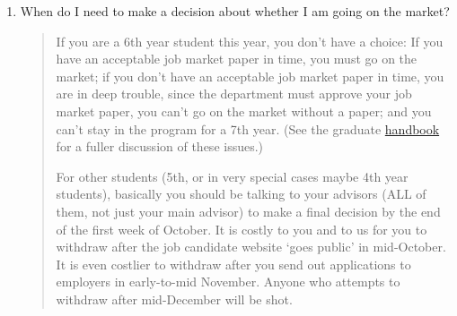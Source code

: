\documentclass{\classes/econtex}
\begin{document}
\begin{enumerate}
\item  When do I need to make a decision about whether I am going on
  the market?

  \begin{quote}
    If you are a 6th year student this year, you don't have a choice: If
    you have an acceptable job market paper in time, you must go on the
    market; if you don't have an acceptable job market paper in time, you
    are in deep trouble, since the department must approve your job market
    paper, you can't go on the market without a paper; and you can't stay
    in the program for a 7th year.  (See the graduate \href{http://www.econ2.jhu.edu/pdf/Econ\_Grad\_Handbook.pdf}{handbook} for a fuller discussion of these issues.) 

      For other students (5th, or in very special cases maybe 4th year students), basically you should be talking to your advisors (ALL of them, not just your main advisor) to make a final decision by the end of the first week of October.  It is costly to you and to us for you to withdraw after the job candidate website `goes public' in mid-October.  It is even costlier to withdraw after you send out applications to employers in early-to-mid November.  Anyone who attempts to withdraw after mid-December will be shot.

      \begin{comment}

        In the dept meeting on 2006-10-17 a question was raised about
        whether we are really serious about our policy, as stated by Larry,
        that ``there is no such thing as a 7th year student.''  

        The answer is yes.

        There was then some discussion about the relationship between going
        on the job market and remaining in the program, caused by the fact
        that there are currently three students (Tereanu, Svitil, Lu) who
        are clearly not ready for the job market but have not given up all
        hope of finishing a dissertation by August of next year.

        The resolution (subsequently clarified in emails on 2006-10-18 and
        2006-10-19 and an email to Zhou Lu on 2006-10-19 from CDC) was as
        follows.

        Our declared public policy (see the graduate \href{handbook}{http://www.econ2.jhu.edu/pdf/Econ_Grad_Handbook.pdf}) is that nobody can enroll for a 7th year
        in the program.  In practice, if in the opinion of an advisor and
        second advisor, a student's dissertation is essentially complete as
        of August of the 6th year, we may relax this rigor slightly in order
        to arrange a defense and final ``cleaning up'' of details - but \textit{  only} in the case where the dissertation is in all essentials
        complete.


\end{comment}
\end{quote}
\end{enumerate}
\end{document}
